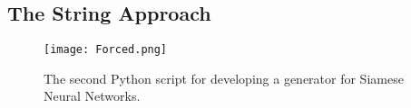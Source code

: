 \documentclass[
	letterpaper, %
	10pt, %
	unnumberedsections, %
	twoside, %
]{LTJournalArticle}
\begin{document}
\subsection{The String Approach}


\begin{figure*}[hbt!] %
	\centering
    \texttt{[image: Forced.png]}
	\caption{The second Python script for developing a generator for Siamese Neural Networks.}
	\label{fig:directory_dataset_generator}
\end{figure*}

\subsection{}


% 
% 
% 
%          
% 
\end{document}
